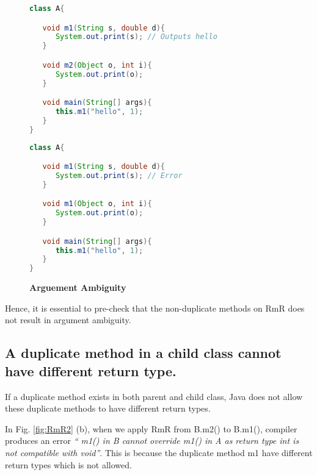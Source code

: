 \begin{figure}[th]
\centering
\begin{minipage}[t]{0.8\linewidth}
\begin{lstlisting}[language=java, basicstyle=\scriptsize\ttfamily,frame=single]
class A{

   void m1(String s, double d){
      System.out.print(s); // Outputs hello
   }

   void m2(Object o, int i){
      System.out.print(o);
   }

   void main(String[] args){
      this.m1("hello", 1);
   }
}
\end{lstlisting}
\end{minipage}
\hfill
\begin{minipage}[t]{0.8\linewidth}
\begin{lstlisting}[language=java, basicstyle=\scriptsize\ttfamily,frame=single]
class A{

   void m1(String s, double d){
      System.out.print(s); // Error
   }

   void m1(Object o, int i){
      System.out.print(o);
   }

   void main(String[] args){
      this.m1("hello", 1);
   }
}

\end{lstlisting}
\end{minipage}
\caption{\textbf{Arguement Ambiguity}}
\label{fig:RmR5}
\end{figure}

Hence, it is essential to pre-check that the non-duplicate methods on RmR does not result in argument ambiguity.

\subsection{A duplicate method in a child class cannot have different return type.}

If a duplicate method exists in both parent and child class, Java does not allow these duplicate methods to have different return types.

In Fig. \ref{fig:RmR2} (b), when we apply RmR from B.m2() to B.m1(), compiler produces an error \textsl{`` m1() in B cannot override m1() in A as return type int is not compatible with void''}. This is because the duplicate method m1 have different return types which is not allowed. 

